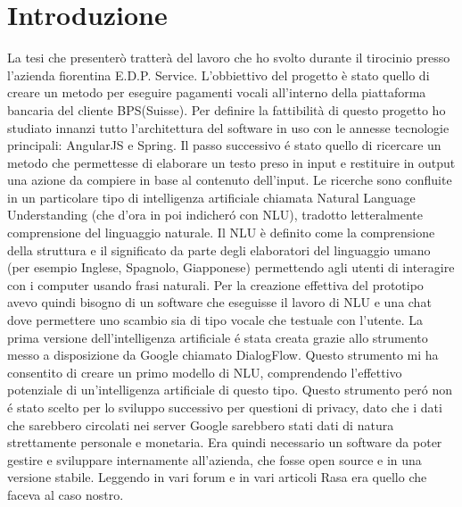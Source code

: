 \chapter{Introduzione}

La tesi che presenter\`{o} tratter\`{a} del lavoro che ho svolto durante il tirocinio presso l'azienda fiorentina E.D.P. Service. 
L'obbiettivo del progetto \`{e} stato quello di creare un metodo per eseguire pagamenti vocali all'interno della piattaforma bancaria del cliente BPS(Suisse).
Per definire la fattibilit\`{a} di questo progetto ho studiato innanzi tutto l'architettura del software in uso con le annesse tecnologie principali: AngularJS e Spring.
Il passo successivo \'{e} stato quello di ricercare un metodo che permettesse di elaborare un testo preso in input e restituire in output una azione da compiere in base al contenuto dell'input. Le ricerche sono confluite in un particolare tipo di intelligenza artificiale chiamata Natural Language Understanding (che d'ora in poi indicher\'{o} con NLU), tradotto letteralmente comprensione del linguaggio naturale. 
Il NLU \`{e} definito come la comprensione della struttura e il significato da parte degli elaboratori del linguaggio umano (per esempio Inglese, Spagnolo, Giapponese) permettendo agli utenti di interagire con i computer usando frasi naturali.
Per la creazione effettiva del prototipo avevo quindi bisogno di un software che eseguisse il lavoro di NLU e una chat dove permettere uno scambio sia di tipo vocale che testuale con l'utente.
La prima versione dell'intelligenza artificiale \'e stata creata grazie allo strumento messo a disposizione da Google chiamato DialogFlow. Questo strumento mi ha consentito di creare un primo modello di NLU, comprendendo l'effettivo potenziale di un'intelligenza artificiale di questo tipo. 
Questo strumento per\'o non \'e stato scelto per lo sviluppo successivo per questioni di privacy, dato che i dati che sarebbero circolati nei server Google sarebbero stati dati di natura strettamente personale e monetaria.
Era quindi necessario un software da poter gestire e sviluppare internamente all'azienda, che fosse open source e in una versione stabile. Leggendo in vari forum e in vari articoli Rasa era quello che faceva al caso nostro.
